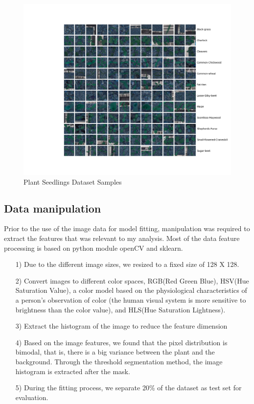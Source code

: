 \documentclass[11pt]{article}
\begin{document}
\begin{center}
\begin{figure}[htb]
\centering 
\includegraphics[width=13cm]{sample_images.png}
\caption{Plant Seedlings Dataset Samples}
\end{figure}
\end{center}

\subsection{Data manipulation}
Prior to the use of the image data for model fitting, manipulation was required to extract the features that was relevant to my analysis. Most of the data feature processing is based on python module openCV\citep{howse2013opencv} and sklearn\citep{pedregosa2011scikit}.
\begin{itemize}
\item[1)] Due to the different image sizes, we resized to a fixed size of 128 X 128.
\item[2)] Convert images to different color spaces, RGB(Red Green Blue), HSV(Hue Saturation Value), a color model based on the physiological characteristics of a person's observation of color (the human visual system is more sensitive to brightness than the color value), and HLS(Hue Saturation Lightness). 
\item[3)] Extract the histogram of the image to reduce the feature dimension
\item[4)] Based on the image features, we found that the pixel distribution is bimodal, that is, there is a big variance between the plant and the background. Through the threshold segmentation method, the image histogram is extracted after the mask.
\item[5)] During the fitting process, we separate 20\% of the dataset as test set for evaluation.
\end{itemize}
\end{document}
